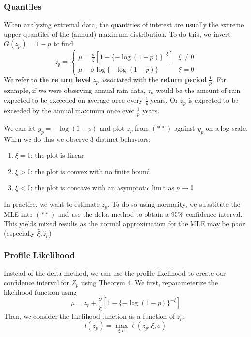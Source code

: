 \documentclass{article}
\theoremstyle{definition}
\theoremstyle{definition}
\def\l{\ell}
\begin{document}
\subsubsection{Quantiles}
When analyzing extremal data, the quantities of interest are usually the extreme upper quantiles of the (annual) maximum distribution. To do this, we invert $G(z_p)=1-p$ to find
\[z_p=\begin{cases} \mu=\frac{\sigma}{\xi}[1-\{-\log(1-p)\}^{-\xi}] & \xi\neq 0\\
\mu-\sigma\log\{-\log(1-p)\}&\xi= 0
\end{cases} \tag{**}\]
We refer to the \textbf{return level} $z_p$ associated with the \textbf{return period} $\frac{1}{p}$. For example, if we were observing annual rain data, $z_p$ would be the amount of rain  expected to be exceeded on average once every  $\frac{1}{p}$ years. Or $z_p$ is expected to be exceeded by the annual maximum once ever  $\frac{1}{p}$ years.

We can let $y_p=-\log(1-p)$ and plot $z_p$ from $(**)$ against $y_p$ on a log scale. When we do this we observe 3 distinct behaviors:
\begin{enumerate}
    \item $\xi=0$: the plot is linear
    \item $\xi>0$: the plot is convex with no finite bound
    \item $\xi<0$: the plot is concave with an asymptotic limit as $p\rightarrow 0$
\end{enumerate}
In practice, we want to estimate $z_p$. To do so using normality, we substitute the MLE into $(**)$ and use the delta method to obtain a 95\% confidence interval. This yields mixed results as the normal approximation for the MLE may be poor (especially $\hat{\xi},\hat{z}_p $)
\subsubsection{Profile Likelihood}
Instead of the delta method, we can use the profile likelihood to create our confidence interval for $Z_p$ using Theorem 4. We first, reparameterize the likelihood function using
\[\mu=z_p+\frac{\sigma}{\xi}[1-\{-\log(1-p)\}^{-\xi}]\]
Then, we consider the likelihood function as a function of $z_p$:
\[l(z_p)= \max_{\xi, \sigma}\l(z_p,\xi, \sigma)\]
\end{document}
